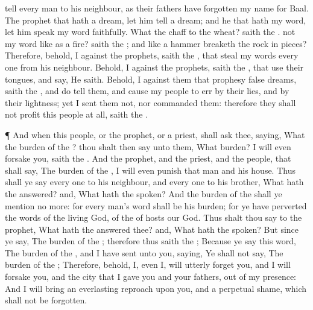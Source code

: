 {tell every
man to his
neighbour, as their
fathers have
forgotten my
name for
Baal.
The
prophet that hath a
dream, let him
tell a
dream; and he that hath my
word, let him
speak my
word
faithfully. What
{} the
chaff to the
wheat?
saith the
{}.
 not my
word
like as a
fire?
saith the
{}; and like a
hammer
{}
breaketh the
rock in
pieces?
Therefore, behold, I
{} against the
prophets,
saith the
{}, that
steal my
words every
one from his
neighbour.
Behold, I
{} against the
prophets,
saith the
{}, that
use their
tongues, and
say, He
saith.
Behold, I
{} against them that
prophesy
false
dreams,
saith the
{}, and do
tell them, and cause my
people to
err by their
lies, and by their
lightness; yet I
sent them not, nor
commanded them: therefore they shall not
profit this
people at
all,
saith the
{}.
\par }{\PP {}¶ And when this
people, or the
prophet, or a
priest, shall
ask thee,
saying, What
{} the
burden of the
{}? thou shalt then
say unto them, What
burden? I will even
forsake you,
saith the
{}.
And
{} the
prophet, and the
priest, and the
people, that shall
say, The
burden of the
{}, I will even
punish that
man and his
house.
Thus shall ye
say every
one to his
neighbour, and every
one to his
brother, What hath the
{}
answered? and, What hath the
{}
spoken?
And the
burden of the
{} shall ye
mention no more: for every
man’s
word shall be his
burden; for ye have
perverted the
words of the
living
God, of the
{} of
hosts our
God.
Thus shalt thou
say to the
prophet, What hath the
{}
answered thee? and, What hath the
{}
spoken?
But since ye
say, The
burden of the
{}; therefore thus
saith the
{}; Because ye
say this
word, The
burden of the
{}, and I have
sent unto you,
saying, Ye shall not
say, The
burden of the
{};
Therefore, behold, I, even I, will
utterly
forget you, and I will
forsake you, and the
city that I
gave you and your
fathers,
{} out of my
presence:
And I will
bring an
everlasting
reproach upon you, and a
perpetual
shame, which shall not be
forgotten.

}
